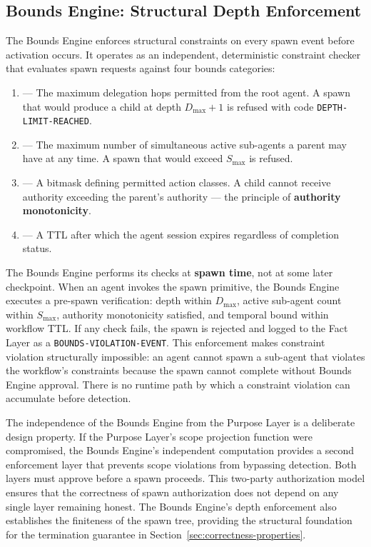 \subsection{Bounds Engine: Structural Depth Enforcement}

The Bounds Engine enforces structural constraints on every spawn event before activation occurs. It operates as an independent, deterministic constraint checker that evaluates spawn requests against four bounds categories:

\begin{enumerate}
  \item[\textbf{Depth Bound ($D_{\max}$)}] — The maximum delegation hops permitted from the root agent. A spawn that would produce a child at depth $D_{\max} + 1$ is refused with code \texttt{DEPTH-LIMIT-REACHED}.
  \item[\textbf{Scope Bound ($S_{\max}$)}] — The maximum number of simultaneous active sub-agents a parent may have at any time. A spawn that would exceed $S_{\max}$ is refused.
  \item[\textbf{Authority Bound}] — A bitmask defining permitted action classes. A child cannot receive authority exceeding the parent's authority — the principle of \textbf{authority monotonicity}.
  \item[\textbf{Temporal Bound ($T_{\text{bounds}}$)}] — A TTL after which the agent session expires regardless of completion status.
\end{enumerate}

The Bounds Engine performs its checks at \textbf{spawn time}, not at some later checkpoint. When an agent invokes the spawn primitive, the Bounds Engine executes a pre-spawn verification: depth within $D_{\max}$, active sub-agent count within $S_{\max}$, authority monotonicity satisfied, and temporal bound within workflow TTL. If any check fails, the spawn is rejected and logged to the Fact Layer as a \texttt{BOUNDS-VIOLATION-EVENT}. This enforcement makes constraint violation structurally impossible: an agent cannot spawn a sub-agent that violates the workflow's constraints because the spawn cannot complete without Bounds Engine approval. There is no runtime path by which a constraint violation can accumulate before detection.

The independence of the Bounds Engine from the Purpose Layer is a deliberate design property. If the Purpose Layer's scope projection function were compromised, the Bounds Engine's independent computation provides a second enforcement layer that prevents scope violations from bypassing detection. Both layers must approve before a spawn proceeds. This two-party authorization model ensures that the correctness of spawn authorization does not depend on any single layer remaining honest. The Bounds Engine's depth enforcement also establishes the finiteness of the spawn tree, providing the structural foundation for the termination guarantee in Section~\ref{sec:correctness-properties}.

